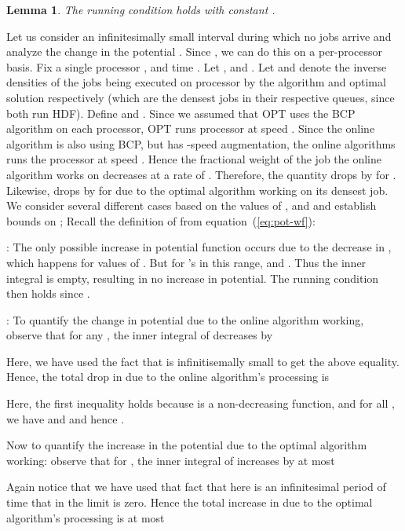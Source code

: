 \documentclass[11pt]{article}
\newtheorem{lemma}{Lemma}[section]
\newenvironment{proof}{\vspace{-0.15in}\noindent{\bf Proof:}}{\hspace*{\fill}\par}
\newcommand{\opt}{\textrm{\sc OPT}\xspace}
\newcommand{\bcp}{{\sf BCP}\xspace}
\begin{document}
\begin{lemma}
  \label{lem:running-wtd}
The running condition holds with constant .
\end{lemma}


\begin{proof}
Let us consider an infinitesimally small interval  during
which no jobs arrive and analyze the change in the potential .
Since , we can do this on a per-processor
basis. Fix a single processor , and time .
Let , and
.
Let  and  denote the inverse densities of the jobs being
executed on processor  by the algorithm and optimal solution
respectively (which are the densest jobs in their respective queues,
since both run HDF). Define  and . Since we assumed that \opt uses the \bcp algorithm on each
processor,  \opt runs processor  at speed .
Since the online algorithm is also using \bcp, but has
-speed augmentation, the online algorithms
runs the processor at speed
. Hence the
fractional weight of the job the online algorithm works on decreases at
a rate of .  Therefore, the quantity
 drops by  for .
Likewise,  drops by  for  due to
the optimal algorithm working on its densest job. We consider
several different cases based on the values of , and  and establish bounds on ;
Recall the definition of 
from equation~(\ref{eq:pot-wf}):



\medskip {}:
The only
possible increase in potential function occurs due to the decrease in
, which happens for values of .
But for 's in this range,  and .
Thus the inner integral is empty, resulting in no increase in potential.
The running condition then holds since .

\medskip {}:
To quantify the change in potential due to the
online algorithm working, observe that for any , the
inner integral of  decreases by

Here, we have used the fact that  is infinitisemally small to get the above equality. Hence, the total drop in  due to the online algorithm's
processing is

Here, the first inequality holds because  is a non-decreasing function, and for all , we have  and  and hence .


Now to quantify the increase in the potential due to the optimal algorithm
working: observe that for , the inner integral of
 increases by at most

Again notice that we have used that fact that here  is an infinitesimal period of time that in the limit is zero. Hence the total increase in  due to the optimal algorithm's processing
is at most


\end{proof}
\end{document}
